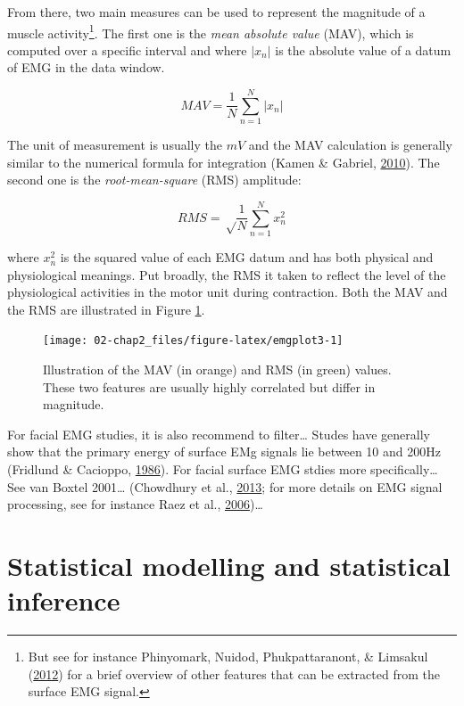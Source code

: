 \documentclass[a4paper,12pt,twoside,openright,oldfontcommands]{memoir}
\let\rmarkdownfootnote\footnote%
\def\footnote{\protect\rmarkdownfootnote}
\begin{document}
From there, two main measures can be used to represent the magnitude of
a muscle activity\footnote{But see for instance Phinyomark, Nuidod,
  Phukpattaranont, \& Limsakul
  (\protect\hyperlink{ref-phinyomark_feature_2012}{2012}) for a brief
  overview of other features that can be extracted from the surface EMG
  signal.}. The first one is the \emph{mean absolute value} (MAV), which
is computed over a specific interval and where \(|x_{n}|\) is the
absolute value of a datum of EMG in the data window.

\[MAV = \frac{1}{N} \sum_{n=1}^{N} | x_{n} |\]

The unit of measurement is usually the \(mV\) and the MAV calculation is
generally similar to the numerical formula for integration (Kamen \&
Gabriel, \protect\hyperlink{ref-kamen_essentials_2010}{2010}). The
second one is the \emph{root-mean-square} (RMS) amplitude:

\[RMS = \sqrt \frac{1}{N} \sum_{n=1}^{N} x^{2}_{n}\]

where \(x^{2}_{n}\) is the squared value of each EMG datum and has both
physical and physiological meanings. Put broadly, the RMS it taken to
reflect the level of the physiological activities in the motor unit
during contraction. Both the MAV and the RMS are illustrated in Figure
\ref{fig:emgplot3}.

\begin{figure}[H]

{\centering \texttt{[image: 02-chap2\_files/figure-latex/emgplot3-1]} 

}

\caption{Illustration of the MAV (in orange) and RMS (in green) values. These two features are usually highly correlated but differ in magnitude.}\label{fig:emgplot3}
\end{figure}

For facial EMG studies, it is also recommend to filter\ldots{} Studes
have generally show that the primary energy of surface EMg signals lie
between 10 and 200Hz (Fridlund \& Cacioppo,
\protect\hyperlink{ref-fridlund_guidelines_1986}{1986}). For facial
surface EMG stdies more specifically\ldots{} See van Boxtel 2001\ldots{}
(Chowdhury et al., \protect\hyperlink{ref-chowdhury_surface_2013}{2013};
for more details on EMG signal processing, see for instance Raez et al.,
\protect\hyperlink{ref-raez_techniques_2006}{2006})\ldots{}

\section{Statistical modelling and statistical
inference}\label{statistical-modelling-and-statistical-inference}
\end{document}
